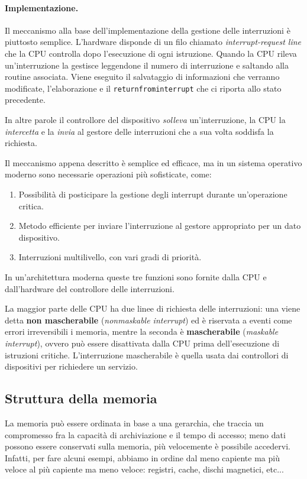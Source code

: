         \paragraph{Implementazione.}
            Il meccanismo alla base dell'implementazione della gestione delle interruzioni è piuttosto semplice. L'hardware disponde di un filo chiamato \textit{interrupt-request line} che la CPU controlla dopo l'esecuzione di ogni istruzione. Quando la CPU rileva un'interruzione la gestisce leggendone il numero di interruzione e saltando alla routine associata. Viene eseguito il salvataggio di informazioni che verranno modificate, l'elaborazione e il \texttt{return\textunderscore from\textunderscore interrupt} che ci riporta allo stato precedente.
            
            In altre parole il controllore del dispositivo \textit{solleva} un'interruzione, la CPU la \textit{intercetta} e la \textit{invia} al gestore delle interruzioni che a sua volta soddisfa la richiesta.
            
            Il meccanismo appena descritto è semplice ed efficace, ma in un sistema operativo moderno sono necessarie operazioni più sofisticate, come:
            \begin{enumerate}
                \item Possibilità di posticipare la gestione degli interrupt durante un'operazione critica.
                \item Metodo efficiente per inviare l'interruzione al gestore appropriato per un dato dispositivo.
                \item Interruzioni multilivello, con vari gradi di priorità.
            \end{enumerate}
            
            In un'architettura moderna queste tre funzioni sono fornite dalla CPU e dall'hardware del controllore delle interruzioni.
            
            La maggior parte delle CPU ha due linee di richiesta delle interruzioni: una viene detta \textbf{non mascherabile} (\textit{nonmaskable interrupt}) ed è riservata a eventi come errori irreversibili i memoria, mentre la seconda è \textbf{mascherabile} (\textit{maskable interrupt}), ovvero può essere disattivata dalla CPU prima dell'esecuzione di istruzioni critiche. L'interruzione mascherabile è quella usata dai controllori di dispositivi per richiedere un servizio.
            
    \newpage
    \subsection{Struttura della memoria}
        La memoria può essere ordinata in base a una gerarchia, che traccia un compromesso fra la capacità di archiviazione e il tempo di accesso; meno dati possono essere conservati sulla memoria, più velocemente è possibile accedervi. Infatti, per fare alcuni esempi, abbiamo in ordine dal meno capiente ma più veloce al più capiente ma meno veloce: registri, cache, dischi magnetici, etc...
        
